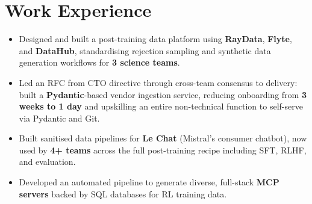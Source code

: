 \documentclass[a4paper]{deedy-resume} %
\begin{document}
\vspace{-10pt}
\section{Work Experience}
\vspace{-5pt}
\begin{itemize}
    \item Designed and built a post-training data platform using \textbf{RayData}, \textbf{Flyte}, and \textbf{DataHub}, standardising rejection sampling and synthetic data generation workflows for \textbf{3 science teams}.
    \item Led an RFC from CTO directive through cross-team consensus to delivery: built a \textbf{Pydantic}-based vendor ingestion service, reducing onboarding from \textbf{3 weeks to 1 day} and upskilling an entire non-technical function to self-serve via Pydantic and Git.
    \item Built sanitised data pipelines for \textbf{Le Chat} (Mistral's consumer chatbot), now used by \textbf{4+ teams} across the full post-training recipe including SFT, RLHF, and evaluation.
    \item Developed an automated pipeline to generate diverse, full-stack \textbf{MCP servers} backed by SQL databases for RL training data.
\end{itemize}
\end{document}
